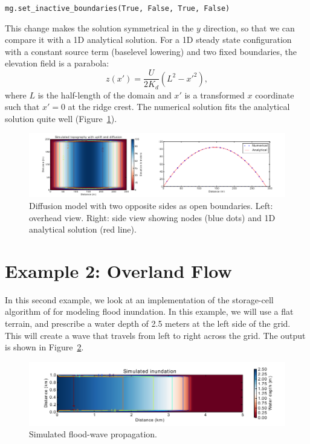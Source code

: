 \documentclass[12pt]{article}
\newcommand{\code}[1]{{\tt #1}}
\begin{document}
\code{mg.set\_inactive\_boundaries(True, False, True, False)}

This change makes the solution symmetrical in the $y$ direction, so that we can compare it with a 1D analytical solution. For a 1D steady state configuration with a constant source term (baselevel lowering) and two fixed boundaries, the elevation field is a parabola:
\begin{equation}
z(x') = \frac{U}{2K_d} \left( L^2 - x'^2 \right),
\end{equation}
where $L$ is the half-length of the domain and $x'$ is a transformed $x$ coordinate such that $x'=0$ at the ridge crest. The numerical solution fits the analytical solution quite well (Figure~\ref{diffrasteranalytical}).

 \begin{figure}[h!]
    \centering
    \includegraphics{diffusion_raster_with_analytical.pdf}
    \caption{Diffusion model with two opposite sides as open boundaries. Left: overhead view. Right: side view showing nodes (blue dots) and 1D analytical solution (red line).}
   \label{diffrasteranalytical}
\end{figure}



\section{Example 2: Overland Flow}

In this second example, we look at an implementation of the storage-cell algorithm of \citet{bates2010simple} for modeling flood inundation. In this example, we will use a flat terrain, and prescribe a water depth of 2.5 meters at the left side of the grid. This will create a wave that travels from left to right across the grid. The output is shown in Figure~\ref{inundation}.

 \begin{figure}[h!]
    \centering
    \includegraphics{inundation.pdf}
    \caption{Simulated flood-wave propagation.}
   \label{inundation}
\end{figure}
\end{document}
